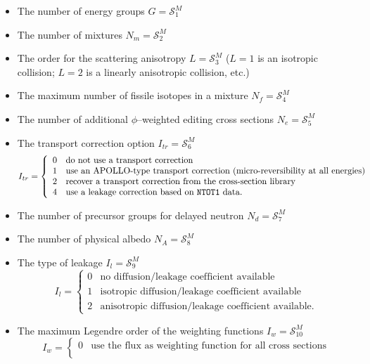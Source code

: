 \begin{itemize}
\item The number of energy groups ${G}=\mathcal{S}^{M}_{1}$ 
\item The number of mixtures $N_{m}=\mathcal{S}^{M}_{2}$
\item The order for the scattering anisotropy $L=\mathcal{S}^{M}_{3}$ 
($L=1$ is an isotropic collision; $L=2$ is a linearly anisotropic collision,
etc.)
\item The maximum number of fissile isotopes in a mixture $N_{f}=\mathcal{S}^{M}_{4}$ 
\item The number of additional $\phi$--weighted editing cross sections $N_{e}=\mathcal{S}^{M}_{5}$ 
\item The transport correction option $I_{tr}=\mathcal{S}^{M}_{6}$ 
\begin{displaymath}
I_{tr} = \left\{
\begin{array}{ll}
0 & \textrm{do not use a transport correction}\\
1 & \textrm{use an APOLLO-type transport correction (micro-reversibility at
all energies)}\\
2 & \textrm{recover a transport correction from the cross-section library}\\
4 & \textrm{use a leakage correction based on {\tt NTOT1} data.}
\end{array} \right.
\end{displaymath}
\item The number of precursor groups for delayed neutron $N_{d}=\mathcal{S}^{M}_{7}$ 
\item The number of physical albedo $N_{A}=\mathcal{S}^{M}_{8}$ 
\item The type of leakage $I_{l}=\mathcal{S}^{M}_{9}$ 
\begin{displaymath}
I_{l} = \left\{
\begin{array}{ll}
0 & \textrm{no diffusion/leakage coefficient available}\\
1 & \textrm{isotropic diffusion/leakage coefficient available}\\
2 & \textrm{anisotropic diffusion/leakage coefficient available.}
\end{array} \right.
\end{displaymath}
\item The maximum Legendre order of the weighting functions $I_{w}=\mathcal{S}^{M}_{10}$ 
\begin{displaymath}
I_{w} = \left\{
\begin{array}{ll}
0 & \textrm{use the flux as weighting function for all cross sections}\\

\end{array}
\end{displaymath}
\end{itemize}
